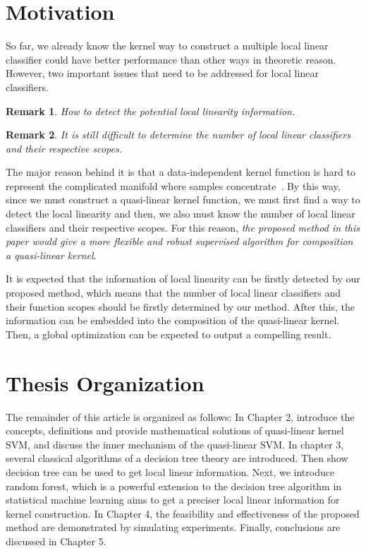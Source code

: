 \documentclass[master]{IPSstyle}
\newtheorem{remark}{Remark}
\begin{document}
\section{Motivation}
So far, we already know the kernel way to construct a multiple local linear classifier could have better performance than other ways in theoretic reason. However, two important issues that need to be addressed for local linear classifiers.
\begin{remark}\label{mark:dectect_linear}
\noindent How to detect the potential local linearity information.
\end{remark}
\begin{remark}\label{mark:numM}
\noindent  It is still difficult to determine the number of local linear classifiers and their respective scopes.
\end{remark}

The major reason behind it is that a data-independent kernel function is hard to represent the complicated manifold where samples concentrate~\cite{bengio2013representation}. By this way, since we must construct a quasi-linear kernel function, we must first find a way to detect the local linearity and then, we also must know the number of local linear classifiers and their respective scopes. For this reason, \emph{the proposed method in this paper would give a more flexible and robust supervised algorithm for composition a quasi-linear kernel}.

It is expected that the information of local linearity can be firstly detected by our proposed method, which means that the number of local linear classifiers and their function scopes should be firstly determined by our method. After this, the information can be embedded into the composition of the quasi-linear kernel. Then, a global optimization can be expected to output a compelling result.

\section{Thesis Organization}
The remainder of this article is organized as follows: In Chapter 2, introduce the concepts, definitions and provide mathematical solutions of quasi-linear kernel SVM, and discuss the inner mechanism of the quasi-linear SVM. In chapter 3, several classical algorithms of a decision tree theory are introduced. Then show decision tree can be used to get local linear information. Next, we introduce random forest, which is a powerful extension to the decision tree algorithm in statistical machine learning aims to get a preciser local linear information for kernel construction. In Chapter 4, the feasibility and effectiveness of the proposed method are demonstrated by simulating experiments. Finally, conclusions are discussed in Chapter 5.
\end{document}
